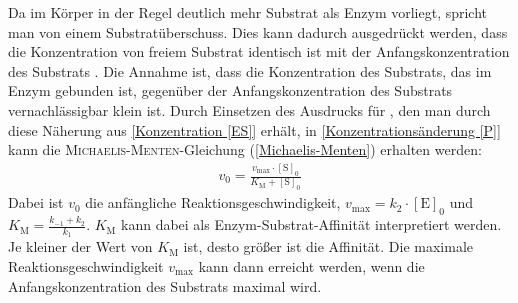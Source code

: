 \documentclass[../kl11.tex]{subfiles}
\begin{document}
Da im Körper in der Regel deutlich mehr Substrat als Enzym vorliegt, spricht man von einem Substratüberschuss. Dies kann dadurch ausgedrückt werden, dass die Konzentration von freiem Substrat \ce{[\mathrm{S}]} identisch ist mit der Anfangskonzentration des Substrats . Die Annahme ist, dass die Konzentration des Substrats, das im Enzym gebunden ist, gegenüber der Anfangskonzentration des Substrats vernachlässigbar klein ist.
Durch Einsetzen des Ausdrucks für \ce{[\mathrm{ES}]}, den man durch diese Näherung aus \autoref{Konzentration [ES]} erhält, in \autoref{Konzentrationsänderung [P]} kann die \textsc{Michaelis-Menten}-Gleichung (\autoref{Michaelis-Menten}) erhalten werden:
\begin{align}
v_0 = \frac{v_{\mathrm{max}}\cdot [\mathrm{S}]_0}{K_{\mathrm{M}} + [\mathrm{S}]_0} \label{Michaelis-Menten}
\end{align}
Dabei ist $v_0$ die anfängliche Reaktionsgeschwindigkeit, $v_{\mathrm{max}} = k_2\cdot [\mathrm{E}]_0$ und $K_{\mathrm{M}} = \frac{k_{-1}+k_2}{k_1}$. $K_{\mathrm{M}}$ kann dabei als Enzym-Substrat-Affinität interpretiert werden. Je kleiner der Wert von $K_{\mathrm{M}}$ ist, desto größer ist die Affinität. Die maximale Reaktionsgeschwindigkeit $v_{\mathrm{max}}$ kann dann erreicht werden, wenn die Anfangskonzentration des Substrats  maximal wird.

\newpage
{}
\end{document}
